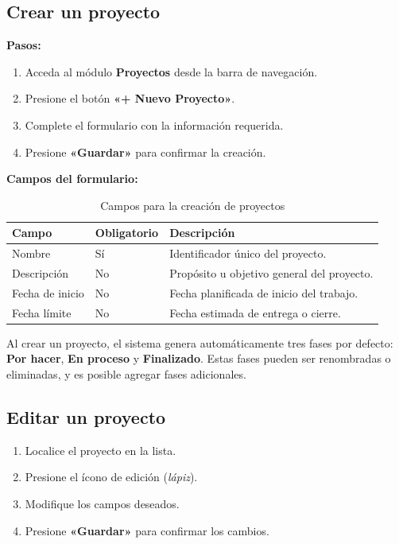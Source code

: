 \documentclass[12pt, a4paper]{article}
\begin{document}
\subsection{Crear un proyecto}

\textbf{Pasos:}
\begin{enumerate}
  \item Acceda al módulo \textbf{Proyectos} desde la barra de navegación.
  \item Presione el botón \textbf{«+ Nuevo Proyecto»}.
  \item Complete el formulario con la información requerida.
  \item Presione \textbf{«Guardar»} para confirmar la creación.
\end{enumerate}

\textbf{Campos del formulario:}

\begin{table}[H]
\centering
\begin{tabularx}{\textwidth}{L{3.5cm} C{2.2cm} L{7.5cm}}
\toprule
\textbf{Campo} & \textbf{Obligatorio} & \textbf{Descripción} \\
\midrule
Nombre        & Sí  & Identificador único del proyecto. \\
Descripción   & No  & Propósito u objetivo general del proyecto. \\
Fecha de inicio & No & Fecha planificada de inicio del trabajo. \\
Fecha límite  & No  & Fecha estimada de entrega o cierre. \\
\bottomrule
\end{tabularx}
\caption{Campos para la creación de proyectos}
\end{table}

\begin{infobox}
Al crear un proyecto, el sistema genera automáticamente tres fases por defecto: \textbf{Por hacer}, \textbf{En proceso} y \textbf{Finalizado}. Estas fases pueden ser renombradas o eliminadas, y es posible agregar fases adicionales.
\end{infobox}

\subsection{Editar un proyecto}

\begin{enumerate}
  \item Localice el proyecto en la lista.
  \item Presione el ícono de edición (\emph{lápiz}).
  \item Modifique los campos deseados.
  \item Presione \textbf{«Guardar»} para confirmar los cambios.
\end{enumerate}
\end{document}
